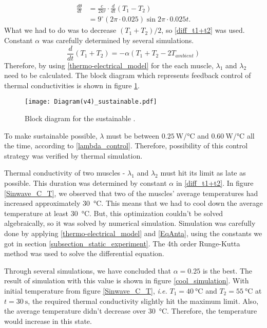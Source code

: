 \begin{equation} \label{theta_diff}
\begin{aligned} 
\frac{d\theta}{dt} & = \frac{c}{2kr}\cdot\frac{d}{dt}(T_{1}-T_{2}) \\
& = 9^{\circ}(2\pi\cdot 0.025)\sin{2\pi\cdot 0.025t}.
\end{aligned}
\end{equation}
What we had to do was to decrease $(T_{1}+T_{2})/2$, so \eqref{diff_t1+t2} was used. Constant $\alpha$ was carefully determined by several simulations.
\begin{equation} \label{diff_t1+t2}
\frac{d}{dt}(T_{1}+T_{2}) = -\alpha(T_{1}+T_{2}-2T_{ambient})
\end{equation}
Therefore, by using \eqref{thermo-electrical_model} for the each muscle, $\lambda_{1}$ and $\lambda_{2}$ need to be calculated. The block diagram which represents feedback control of thermal conductivities is shown in figure \ref{diagram_sustainable}.

\begin{figure}[t]
	\centering\texttt{[image: Diagram(v4)\_sustainable.pdf]}
	\caption{Block diagram for the sustainable \apcnospace.}
	\label{diagram_sustainable}
\end{figure}

To make sustainable \apc possible, $\lambda$ must be between $\SI{0.25}{\watt\per\degreeCelsius}$ and $\SI{0.60}{\watt\per\degreeCelsius}$  all the time, according to \eqref{lambda_control}. Therefore, possibility of this control strategy was verified by thermal simulation.

Thermal conductivity of two muscles - $\lambda_{1}$ and $\lambda_{2}$ must hit its limit as late as possible. 
This duration was determined by constant $\alpha$ in \eqref{diff_t1+t2}. 
In figure \ref{Sinwave_C_T}, we observed that two of the muscles' average temperatures had increased approximately \SI{30}{\degreeCelsius}. This means that we had to cool down the average temperature at least \SI{30}{\degreeCelsius}. 
But, this optimization couldn't be solved algebraically, so it was solved by numerical simulation.
Simulation was carefully done by applying \eqref{thermo-electrical_model} and \eqref{EqAnta}, using the constants we got in section \ref{subsection_static_experiment}. The 4th order Runge-Kutta method was used to solve the differential equation. 

Through several simulations, we have concluded that $\alpha = 0.25$ is the best. The result of simulation with this value is shown in figure \ref{cool_simulation}. With initial temperature from figure \ref{Sinwave_C_T}, {\it i.e.} $T_{1}=\SI{40}{\degreeCelsius}$ and $T_{2}=\SI{55}{\degreeCelsius}$ at $t=\SI{30}{\second}$, the required thermal conductivity slightly hit the maximum limit. Also, the average temperature didn't decrease over \SI{30}{\degreeCelsius}. Therefore, the temperature would increase in this state.

